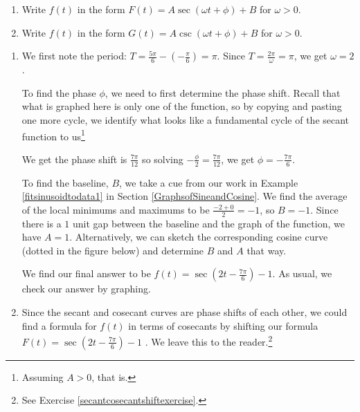 \documentclass{ximera}
\begin{document}
\begin{example}
\begin{enumerate}

\item  Write $f(t)$ in the form $F(t) = A \sec( \omega t + \phi) +B$ for $\omega > 0$.

\item  Write $f(t)$ in the form $G(t) = A \csc( \omega t + \phi) +B$ for $\omega > 0$.

\end{enumerate}

\begin{explanation}

\begin{enumerate}

\item  We first note the period:  $T = \frac{5\pi}{6} - \left(-\frac{\pi}{6}\right) = \pi$.  Since $T  = \frac{2\pi}{\omega} = \pi$, we get $\omega  = 2$.  

To find the phase $\phi$, we need to first determine the phase shift.  Recall that what is graphed here is only one  of the function, so by copying and pasting one more cycle, we identify what looks like a fundamental cycle of the secant function to us\footnote{Assuming $A>0$, that is.}

We get the phase shift is $\frac{7\pi}{12}$ so solving  $ -\frac{\phi}{2} = \frac{7\pi}{12} $, we get $\phi = - \frac{7\pi}{6}$.

To find the baseline, $B$, we take a cue from our work in Example \ref{fitsinusoidtodata1} in Section \ref{GraphsofSineandCosine}.  We find the average of the local minimums and maximums to be $\frac{-2+0}{2} = -1$, so $B = -1$.  Since there is a $1$ unit gap between the baseline and the graph of the function, we have $A = 1$.   Alternatively, we can sketch the corresponding cosine curve (dotted in the figure below) and determine $B$ and $A$ that way.

We find our final answer to be $f(t) = \sec\left( 2 t - \frac{7\pi}{6} \right) -1$.  As usual, we check our answer by graphing. 

\begin{center}
\end{center}

\item  Since the secant and cosecant curves are phase shifts of each other, we could find a formula for $f(t)$ in terms of cosecants by shifting our formula $F(t) = \sec\left( 2 t - \frac{7\pi}{6} \right) -1$ .  We leave this to the reader.\footnote{See Exercise \ref{secantcosecantshiftexercise}.}  


\end{enumerate}
\end{explanation}
\end{example}
\end{document}
